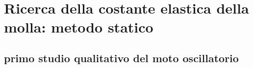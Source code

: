 \section{Ricerca della costante elastica della molla: metodo statico}

\subsection{primo studio qualitativo del moto oscillatorio}